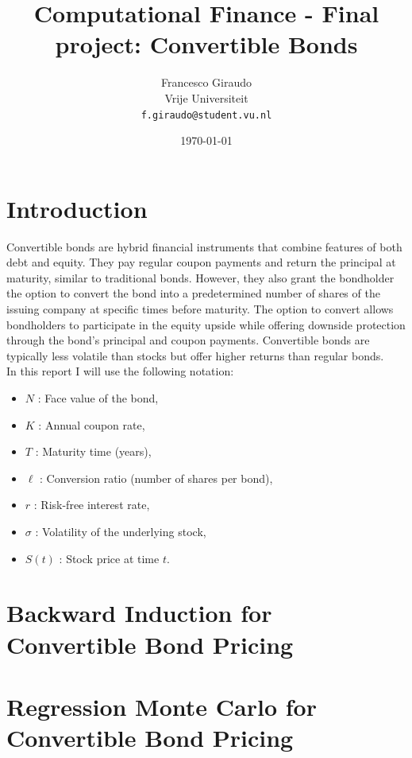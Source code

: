 \documentclass{article}
\title{Computational Finance - Final project: Convertible Bonds}
\author{Francesco Giraudo \\ \small{Vrije Universiteit} \\ {\small\texttt{f.giraudo@student.vu.nl}}}
\date{\today}
\begin{document}
\maketitle

\bigskip

\section*{Introduction}

Convertible bonds are hybrid financial instruments that combine features of both debt and equity. They pay regular coupon payments and return the principal at maturity, similar to traditional bonds. However, they also grant the bondholder the option to convert the bond into a predetermined number of shares of the issuing company at specific times before maturity. The option to convert allows bondholders to participate in the equity upside while offering downside protection through the bond's principal and coupon payments. Convertible bonds are typically less volatile than stocks but offer higher returns than regular bonds.  \\

In this report I will use the following notation:
\begin{itemize}
    \item $N$ : Face value of the bond,
    \item $K$ : Annual coupon rate,
    \item $T$ : Maturity time (years),
    \item $\ell$ : Conversion ratio (number of shares per bond),
    \item $r$ : Risk-free interest rate,
    \item $\sigma$ : Volatility of the underlying stock,
    \item $S(t)$ : Stock price at time $t$.
\end{itemize}

\bigskip

\section{Backward Induction for Convertible Bond Pricing}



\section{Regression Monte Carlo for Convertible Bond Pricing}
\end{document}
